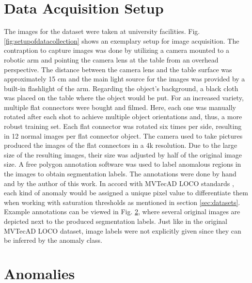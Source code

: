 



\section{Data Acquisition Setup}
\label{sec:faltconnectordataacquisiton}

The images for the dataset were taken at university facilities.  Fig. \ref{fig:setupofdatacollection} shows an exemplary setup for image acquisition. The contraption to capture images was 
done by utilizing a camera mounted to a robotic arm and pointing the camera lens at the table from an overhead perspective. The distance between the camera lens and the table surface was approximately 15 cm and the main light source for the images was provided by a built-in flashlight of the arm. Regarding the object's background, a black cloth was placed on the table where the object would be put. For 
an increased variety, multiple flat connectors were bought and filmed. Here, each one was manually rotated after each shot to achieve multiple object orientations and, thus, a more robust training 
set. Each flat connector was rotated six times per side, resulting in 12 normal images per flat connector object. \newline
The camera used to take pictures produced the images of the flat connectors in a 4k resolution. Due to the large size of the resulting 
images, their size was adjusted by half of the original image size.\newline
A free polygon annotation software was used to label anomalous regions in the images to obtain segmentation labels. The annotations were done by hand and by the author of this work. In accord with 
MVTecAD LOCO standards \cite{LOCODentsAndScratchesBergmann2022}, each kind of anomaly would be assigned a unique pixel value to differentiate them when working with saturation thresholds 
as mentioned in section \ref{sec:datasets}. Example annotations can be viewed in Fig. \ref{sec:flatconnectoranomalies}, where several original images are depicted next to the produced segmentation labels. Just like in the 
original MVTecAD LOCO dataset, image labels were not explicitly given since they can be inferred by the anomaly class.





\section{Anomalies}
\label{sec:flatconnectoranomalies}

